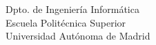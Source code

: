 \chapter*{}

\vspace*{0.2cm}

\begin{center}

\Huge \MakeUppercase{\textbf{\titulo}}

\vspace{7cm}

\Large \autor \\
\Large \director \\
\Large \ponente \\

\vspace{5cm}


Dpto. de Ingeniería Informática \\
Escuela Politécnica Superior \\
Universidad Autónoma de Madrid \\
\fecha

\end{center}

\normalsize

\newpage \thispagestyle{empty} %
